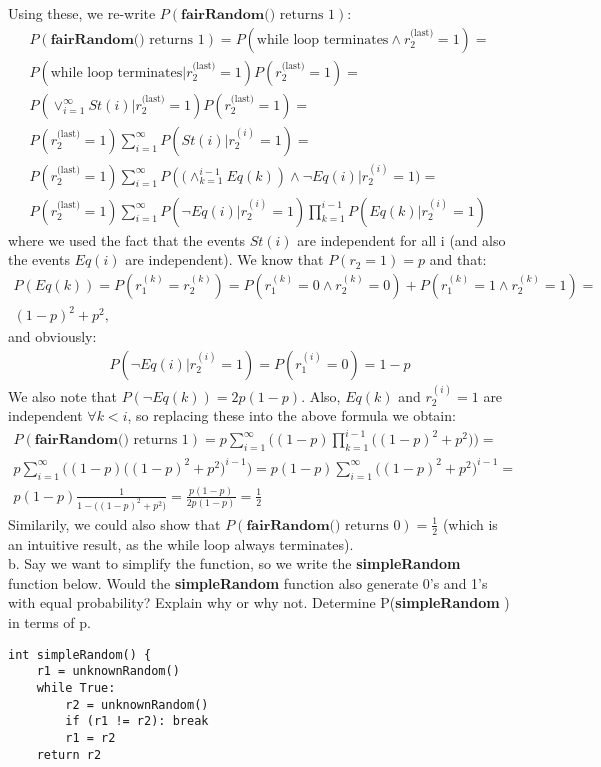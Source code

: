 \documentclass[10pt,a4paper,oneside,draft]{report}
\begin{document}
Using these, we re-write $P(\textbf{fairRandom()} \text{ returns 1})$:
\begin{gather*}
P(\textbf{fairRandom()} \text{ returns 1}) = P(\text{while loop terminates} \land r_2^{\text{(last)}} = 1) = \\
P(\text{while loop terminates} | r_2^{\text{(last)}} = 1) P(r_2^{\text{(last)}} = 1) = \\
P(\lor_{i=1}^{\infty} St(i) | r_2^{\text{(last)}} = 1) P(r_2^{\text{(last)}} = 1) = \\
P(r_2^{\text{(last)}} = 1) \sum_{i=1}^{\infty} P(St(i) | r_2^{(i)} = 1) = \\
P(r_2^{\text{(last)}} = 1) \sum_{i=1}^{\infty}  P(\big(\land_{k=1}^{i-1} Eq(k)) \land \neg Eq(i) | r_2^{(i)} = 1 \big) = \\
P(r_2^{\text{(last)}} = 1) \sum_{i=1}^{\infty} P(\neg Eq(i) | r_2^{(i)} = 1) \prod_{k=1}^{i-1} P(Eq(k) | r_2^{(i)} = 1)
\end{gather*}
where we used the fact that the events $St(i)$ are independent for all i (and also the events $Eq(i)$ are independent). We know that $P(r_2 = 1) = p$ and that:
\begin{gather*} 
P(Eq(k)) = P(r_1^{(k)} = r_2^{(k)}) = P(r_1^{(k)} = 0 \land r_2^{(k)} = 0) + P(r_1^{(k)} = 1 \land r_2^{(k)} = 1) = \\
(1-p)^2 + p^2,
\end{gather*}
and obviously:
\begin{gather*}
P(\neg Eq(i) | r_2^{(i)} = 1) = P(r_1^{(i)} = 0) = 1-p
\end{gather*}
We also note that $P(\neg Eq(k)) = 2p(1-p)$. Also, $Eq(k)$ and $r_2^{(i)} = 1$ are independent $\forall k < i$, so replacing these into the above formula we obtain:
\begin{gather*}
P(\textbf{fairRandom()} \text{ returns 1}) = p \sum_{i=1}^{\infty} \Big( (1-p) \prod_{k=1}^{i-1} \big( (1-p)^2 + p^2 \big) \Big) = \\
p \sum_{i=1}^{\infty} \Big( (1-p) \big( (1-p)^2 + p^2 \big)^{i-1} \Big) = p(1-p) \sum_{i=1}^{\infty} \big( (1-p)^2 + p^2 \big)^{i-1} = \\
p(1-p) \frac{1}{1 - \big( (1-p)^2 + p^2 \big)} = \frac{p(1-p)}{2p(1-p)} = \frac{1}{2}
\end{gather*}
Similarily, we could also show that $P(\textbf{fairRandom()} \text{ returns 0}) = \frac{1}{2}$ (which is an intuitive result, as the while loop always terminates). \\

b. Say we want to simplify the function, so we write the \textbf{simpleRandom} function below. Would the \textbf{simpleRandom} function also generate 0’s and 1’s with equal probability? Explain why or why not. Determine P(\textbf{simpleRandom} ) in terms of p. \\
\begin{verbatim}
int simpleRandom() {
    r1 = unknownRandom()
    while True:
        r2 = unknownRandom()
        if (r1 != r2): break
        r1 = r2
    return r2
\end{verbatim}
\end{document}
